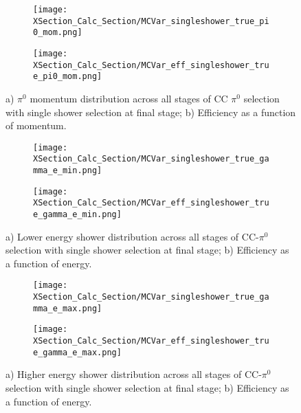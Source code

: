 \begin{figure}[h!]
  \begin{subfigure}[t]{0.39\textwidth}
\texttt{[image: XSection\_Calc\_Section/MCVar\_singleshower\_true\_pi0\_mom.png]}
  \caption{ }
  \end{subfigure} 
  \hspace{15mm}
  \begin{subfigure}[t]{0.39\textwidth}
\texttt{[image: XSection\_Calc\_Section/MCVar\_eff\_singleshower\_true\_pi0\_mom.png]}
  \caption{ }
  \end{subfigure} 
\caption{a) $\pi^0$ momentum distribution across all stages of CC $\pi^0$ selection with single shower selection at final stage; b) Efficiency as a function of momentum. }
\label{fig:pi0_effs_8}
\end{figure}

\begin{figure}[h!]
  \begin{subfigure}[t]{0.39\textwidth}
\texttt{[image: XSection\_Calc\_Section/MCVar\_singleshower\_true\_gamma\_e\_min.png]}
  \caption{ }
  \end{subfigure} 
  \hspace{15mm}
  \begin{subfigure}[t]{0.39\textwidth}
\texttt{[image: XSection\_Calc\_Section/MCVar\_eff\_singleshower\_true\_gamma\_e\_min.png]}
  \caption{ }
  \end{subfigure} 
\caption{a) Lower energy shower distribution across all stages of CC-$\pi^0$ selection with single shower selection at final stage; b) Efficiency as a function of energy. }
\label{fig:pi0_effs_9}
\end{figure}

\begin{figure}[h!]
  \begin{subfigure}[t]{0.39\textwidth}
\texttt{[image: XSection\_Calc\_Section/MCVar\_singleshower\_true\_gamma\_e\_max.png]}
  \caption{ }
  \end{subfigure} 
  \hspace{15mm}
  \begin{subfigure}[t]{0.39\textwidth}
\texttt{[image: XSection\_Calc\_Section/MCVar\_eff\_singleshower\_true\_gamma\_e\_max.png]}
  \caption{ }
  \end{subfigure} 
\caption{a) Higher energy shower distribution across all stages of CC-$\pi^0$ selection with single shower selection at final stage; b) Efficiency as a function of energy. }
\label{fig:pi0_effs_10}
\end{figure}

